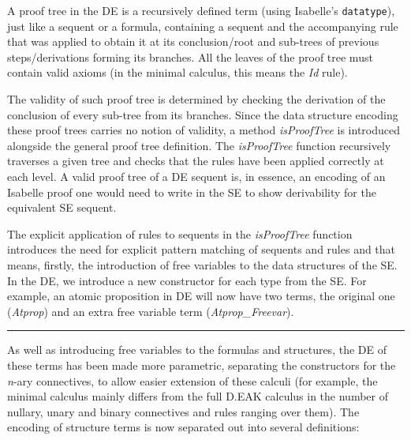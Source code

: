 A proof tree in the DE is a recursively defined term (using Isabelle's
\texttt{datatype}), just like a sequent or a formula, containing a
sequent and the accompanying rule that was applied to obtain it at its
conclusion/root and sub-trees of previous steps/derivations forming its
branches. All the leaves of the proof tree must contain valid axioms (in
the minimal calculus, this means the \emph{Id} rule).

The validity of such proof tree is determined by checking the derivation
of the conclusion of every sub-tree from its branches. Since the data
structure encoding these proof trees carries no notion of validity, a
method \emph{isProofTree} is introduced alongside the general proof tree
definition. The \emph{isProofTree} function recursively traverses a
given tree and checks that the rules have been applied correctly at each
level. A valid proof tree of a DE sequent is, in essence, an encoding of
an Isabelle proof one would need to write in the SE to show derivability
for the equivalent SE sequent.

The explicit application of rules to sequents in the \emph{isProofTree}
function introduces the need for explicit pattern matching of sequents
and rules and that means, firstly, the introduction of free variables to
the data structures of the SE.\\In the DE, we introduce a new
constructor for each type from the SE. For example, an atomic
proposition in DE will now have two terms, the original one
(\emph{Atprop}) and an extra free variable term
(\emph{Atprop\_Freevar}).

\begin{center}\rule{3in}{0.4pt}\end{center}

As well as introducing free variables to the formulas and structures,
the DE of these terms has been made more parametric, separating the
constructors for the \emph{n}-ary connectives, to allow easier extension
of these calculi (for example, the minimal calculus mainly differs from
the full D.EAK calculus in the number of nullary, unary and binary
connectives and rules ranging over them). The encoding of structure
terms is now separated out into several definitions:

\begin{Shaded}
\begin{Highlighting}[]
  \ErrorTok{=} 
 
  \ErrorTok{=} 
                         \ErrorTok{|} 

  \ErrorTok{=}  
                   \ErrorTok{|}  
                   \ErrorTok{|}    
                   \ErrorTok{|}  
\end{Highlighting}
\end{Shaded}

